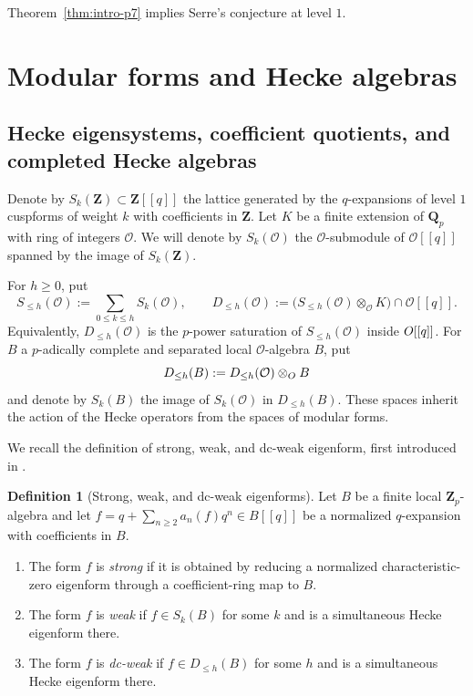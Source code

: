 \documentclass[11pt]{article}
\newcommand{\Z}{\mathbf Z}
\newcommand{\Q}{\mathbf Q}
\newcommand{\cO}{\mathcal O}
\theoremstyle{plain}
\theoremstyle{definition}
\newtheorem{definition}[theorem]{Definition}
\theoremstyle{remark}
\numberwithin{equation}{section}
\begin{document}
Theorem~\ref{thm:intro-p7} implies Serre's conjecture at level $1$. 

\section{Modular forms and Hecke algebras}

\subsection{Hecke eigensystems, coefficient quotients, and completed Hecke algebras}
\label{sec:basic}

Denote by \(S_k(\Z) \subset \Z[[q]]\) the lattice generated by the $q$-expansions of level $1$ cuspforms of weight $k$ with coefficients in $\Z$.  Let $K$ be a finite extension of $\Q_p$ with ring of integers $\cO$. We will denote by $S_k(\cO)$ the $\cO$-submodule of $\cO[[q]]$ spanned by the image of $S_k(\Z)$. 

For \(h\geq0\), put \[ S_{\leq h}(\cO):=\sum_{0\leq k\leq h}S_k(\cO),  \qquad  D_{\leq h}(\cO):= \bigl( S_{\leq h}(\cO)\otimes_{\cO} K\bigr)    \cap\cO[[q]]. \] Equivalently, \(D_{\leq h}(\cO)\) is the \(p\)-power saturation of \(S_{\leq h}(\cO)\) inside \(\mathbf \cO[[q]]\). For $B$ a $p$-adically complete and separated local $\cO$-algebra \(B\), put \[ D_{\leq h}(B):=D_{\leq h}(\cO)\otimes_{\mathbf \cO}B \] and denote by $S_k(B)$ the image of $S_k(\cO)$ in $D_{\leq h}(B)$. These spaces inherit the action of the Hecke operators from the spaces of modular forms. 

We recall the definition of strong, weak, and dc-weak eigenform, first introduced in \cite{CKW2013}.

\begin{definition}[Strong, weak, and dc-weak eigenforms]\label{def:strong-weak} Let \(B\) be a finite local \(\mathbf Z_p\)-algebra and let \(f = q + \sum_{n\geq 2}a_n(f)q^n\in B[[q]]\) be a normalized \(q\)-expansion with coefficients in \(B\).
\begin{enumerate}
\item The form \(f\) is \emph{strong} if it is obtained by reducing a
normalized characteristic-zero eigenform through a coefficient-ring map
to \(B\).
\item The form \(f\) is \emph{weak} if \(f\in S_k(B)\) for some \(k\)
and is a simultaneous Hecke eigenform there.
\item The form \(f\) is \emph{dc-weak} if \(f\in D_{\leq h}(B)\) for
some \(h\) and is a simultaneous Hecke eigenform there.
\end{enumerate}
\end{definition}
\end{document}
